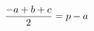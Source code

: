 \documentclass[preview]{standalone}
\begin{document}
\begin{align*}
\special{dvisvgm:raw <g id='unique000'>}\frac{-a+b+c}{2} = p - a\special{dvisvgm:raw </g>}
\end{align*}
\end{document}
